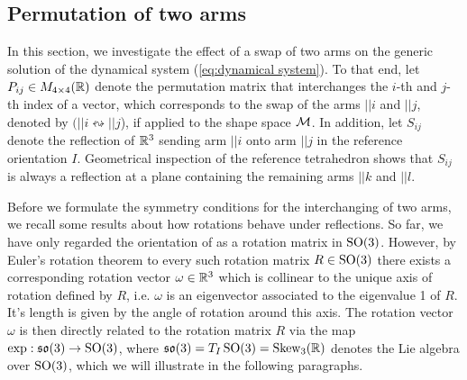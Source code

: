 \subsection{Permutation of two arms}
In this section, we investigate the effect of a swap of two arms on the generic solution of the dynamical system (\ref{eq:dynamical system}).
To that end, let $P_{ij} \in M_{4 \times 4}(\mathbb{R})$ denote the permutation matrix that interchanges the $i$-th and $j$-th index of a vector, which corresponds to the swap of the arms $||i$ and $||j$, denoted by $(||i\leftrightsquigarrow ||j$), if applied to the shape space $\mathcal{M}$. In addition, let $S_{ij}$ denote the reflection of $\mathbb{R}^3$ sending arm $||i$ onto arm $||j$ in the reference orientation $I$. Geometrical inspection of the reference tetrahedron shows that $S_{ij}$ is always a reflection at a plane containing the remaining arms $||k$ and $||l$.

Before we formulate the symmetry conditions for the interchanging of two arms, we recall some results about how rotations behave under reflections. So far, we have only regarded the orientation of \spr as a rotation matrix in $\operatorname{SO}(3)$. However, by Euler's rotation theorem to every such rotation matrix $R \in \operatorname{SO}(3)$ there exists a corresponding rotation vector $\omega \in \mathbb{R}^3$ which is collinear to the unique axis of rotation defined by $R$, i.e. $\omega$ is an eigenvector associated to the eigenvalue 1 of $R$. It's length is given by the angle of rotation around this axis. The rotation vector $\omega$ is then directly related to the rotation matrix $R$ via the map $\exp: \mathfrak{so}(3) \to \operatorname{SO}(3)$, where $\mathfrak{so}(3) = T_I \operatorname{SO}(3) = \operatorname{Skew}_3(\mathbb{R})$ denotes the Lie algebra over $\operatorname{SO}(3)$, which we will illustrate in the following paragraphs.


